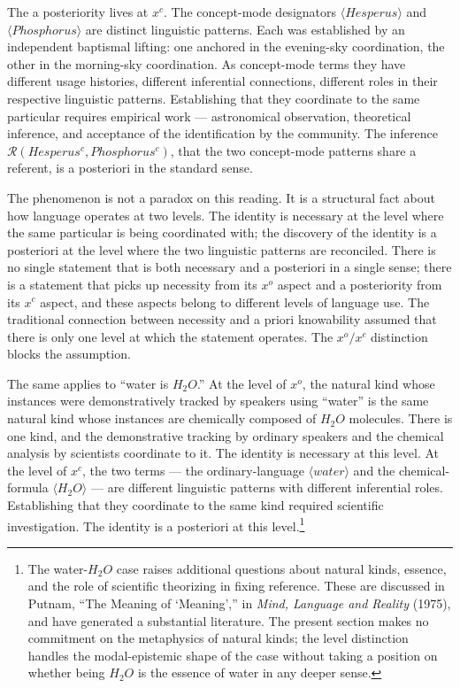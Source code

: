 \documentclass[12pt,a4paper]{article}
\begin{document}
The a posteriority lives at \(x^c\). The concept-mode designators \(\langle Hesperus \rangle\) and \(\langle Phosphorus \rangle\) are distinct linguistic patterns. Each was established by an independent baptismal lifting: one anchored in the evening-sky coordination, the other in the morning-sky coordination. As concept-mode terms they have different usage histories, different inferential connections, different roles in their respective linguistic patterns. Establishing that they coordinate to the same particular requires empirical work --- astronomical observation, theoretical inference, and acceptance of the identification by the community. The inference \(\mathcal{R}(Hesperus^c, Phosphorus^c)\), that the two concept-mode patterns share a referent, is a posteriori in the standard sense.

The phenomenon is not a paradox on this reading. It is a structural fact about how language operates at two levels. The identity is necessary at the level where the same particular is being coordinated with; the discovery of the identity is a posteriori at the level where the two linguistic patterns are reconciled. There is no single statement that is both necessary and a posteriori in a single sense; there is a statement that picks up necessity from its \(x^o\) aspect and a posteriority from its \(x^c\) aspect, and these aspects belong to different levels of language use. The traditional connection between necessity and a priori knowability assumed that there is only one level at which the statement operates. The \(x^o/x^c\) distinction blocks the assumption.

The same applies to ``water is \(H_2O\).'' At the level of \(x^o\), the natural kind whose instances were demonstratively tracked by speakers using ``water'' is the same natural kind whose instances are chemically composed of \(H_2O\) molecules. There is one kind, and the demonstrative tracking by ordinary speakers and the chemical analysis by scientists coordinate to it. The identity is necessary at this level. At the level of \(x^c\), the two terms --- the ordinary-language \(\langle water \rangle\) and the chemical-formula \(\langle H_2O \rangle\) --- are different linguistic patterns with different inferential roles. Establishing that they coordinate to the same kind required scientific investigation. The identity is a posteriori at this level.\footnote{The water-\(H_2O\) case raises additional questions about natural kinds, essence, and the role of scientific theorizing in fixing reference. These are discussed in Putnam, ``The Meaning of `Meaning','' in \emph{Mind, Language and Reality} (1975), and have generated a substantial literature. The present section makes no commitment on the metaphysics of natural kinds; the level distinction handles the modal-epistemic shape of the case without taking a position on whether being \(H_2O\) is the essence of water in any deeper sense.}
\end{document}
